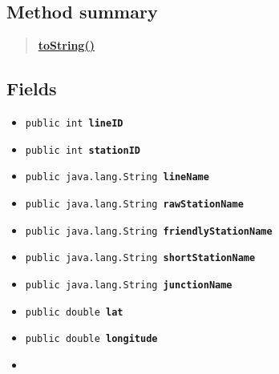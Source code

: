 \documentclass[11pt,a4paper]{report}
\begin{document}
{{{{{{{{{{{{{{{{{{\subsection{Method summary}{
\begin{verse}
\hyperlink{models.TransportStation.toString()}{{\bf toString()}} \\
\end{verse}
}
\subsection{Fields}{
\begin{itemize}
\item{
\label{models.TransportStation.lineID}\hypertarget{models.TransportStation.lineID}{\texttt{public int\ {\bf  lineID}}
}
}
\item{
\label{models.TransportStation.stationID}\hypertarget{models.TransportStation.stationID}{\texttt{public int\ {\bf  stationID}}
}
}
\item{
\label{models.TransportStation.lineName}\hypertarget{models.TransportStation.lineName}{\texttt{public java.lang.String\ {\bf  lineName}}
}
}
\item{
\label{models.TransportStation.rawStationName}\hypertarget{models.TransportStation.rawStationName}{\texttt{public java.lang.String\ {\bf  rawStationName}}
}
}
\item{
\label{models.TransportStation.friendlyStationName}\hypertarget{models.TransportStation.friendlyStationName}{\texttt{public java.lang.String\ {\bf  friendlyStationName}}
}
}
\item{
\label{models.TransportStation.shortStationName}\hypertarget{models.TransportStation.shortStationName}{\texttt{public java.lang.String\ {\bf  shortStationName}}
}
}
\item{
\label{models.TransportStation.junctionName}\hypertarget{models.TransportStation.junctionName}{\texttt{public java.lang.String\ {\bf  junctionName}}
}
}
\item{
\label{models.TransportStation.lat}\hypertarget{models.TransportStation.lat}{\texttt{public double\ {\bf  lat}}
}
}
\item{
\label{models.TransportStation.longitude}\hypertarget{models.TransportStation.longitude}{\texttt{public double\ {\bf  longitude}}
}
}
\item{
}
\end{itemize}}}}}}}}}}}}}}}}}}}}
\end{document}

